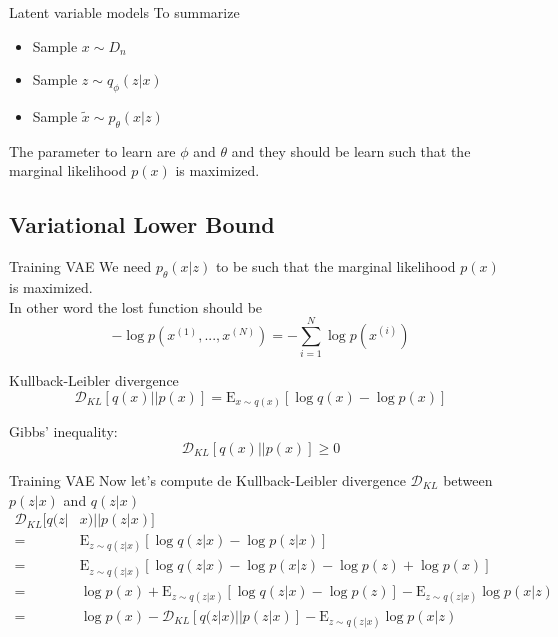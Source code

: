 \documentclass{beamer}
\newcommand{\kldiv}{\mathcal{D}_{KL}}
\newcommand{\E}{\mathrm{E}}
\begin{document}
\begin{frame}{Latent variable models}
	To summarize
	\begin{itemize}
		\item Sample $x \sim D_n$
		\item Sample $z \sim q_\phi(z|x)$
		\item Sample $\tilde{x} \sim p_\theta(x|z)$
	\end{itemize}
	The parameter to learn are $\phi$ and $\theta$ and they should be learn such that the marginal likelihood $p(x)$ is maximized.
\end{frame}

\subsection{Variational Lower Bound}

\begin{frame}{Training VAE}
	We need $p_\theta(x|z)$ to be such that the marginal likelihood $p(x)$ is maximized. \\
	
	In other word the lost function should be
	\[
		-\log p(x^{(1)},...,x^{(N)}) = -\sum_{i=1}^N \log p(x^{(i)})
	\]
\end{frame}

\begin{frame}{Kullback-Leibler divergence}
	\begin{equation}
		\kldiv[q(x)||p(x)] 
		= \E_{x\sim q(x)}[ \log q(x) - \log p(x)]
	\end{equation}

	\bigskip

	Gibbs' inequality:
	\begin{equation}
		\kldiv[q(x)||p(x)] \geq 0
	\end{equation}
\end{frame}

\begin{frame}{Training VAE}
	Now let's compute de Kullback-Leibler divergence $\kldiv$ between $p(z|x)$ and $q(z|x)$
	\begin{equation*}
	\begin{split}
		\kldiv[q(z|&x)||p(z|x)]\\ 
		=& \E_{z\sim q(z|x)}[ \log q(z|x) - \log p(z|x)]\\
		=& \E_{z\sim q(z|x)}[ \log q(z|x) - \log p(x|z) - \log p(z) + \log p(x)]\\
		=& \log p(x) + \E_{z\sim q(z|x)}[ \log q(z|x)  - \log p(z)] - \E_{z\sim q(z|x)}\log p(x|z)\\
		=& \log p(x) - \kldiv[q(z|x)||p(z|x)] - \E_{z\sim q(z|x)}\log p(x|z)\\
	\end{split}
	\end{equation*}
\end{frame}
\end{document}
